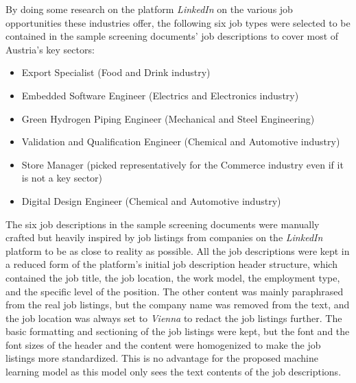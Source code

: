 \documentclass[draft,final]{thesisclass} %
\begin{document}
By doing some research on the platform \textit{LinkedIn} \parencite{linkedin} on the various job opportunities these industries offer, the following six job types were selected to be contained in the sample screening documents' job descriptions to cover most of Austria's key sectors:
\begin{itemize}
    \item Export Specialist (Food and Drink industry)
    \item Embedded Software Engineer (Electrics and Electronics industry)
    \item Green Hydrogen Piping Engineer (Mechanical and Steel Engineering)
    \item Validation and Qualification Engineer (Chemical and Automotive industry)
    \item Store Manager (picked representatively for the Commerce industry even if it is not a key sector)
    \item Digital Design Engineer (Chemical and Automotive industry)
\end{itemize}
The six job descriptions in the sample screening documents were manually crafted but heavily inspired by job listings from companies on the \textit{LinkedIn} platform to be as close to reality as possible.
All the job descriptions were kept in a reduced form of the platform's initial job description header structure, which contained the job title, the job location, the work model, the employment type, and the specific level of the position.
The other content was mainly paraphrased from the real job listings, but the company name was removed from the text, and the job location was always set to \textit{Vienna} to redact the job listings further.
The basic formatting and sectioning of the job listings were kept, but the font and the font sizes of the header and the content were homogenized to make the job listings more standardized.
This is no advantage for the proposed machine learning model as this model only sees the text contents of the job descriptions.
\end{document}
